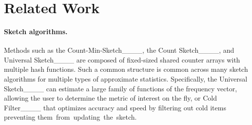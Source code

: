\section{Related Work}
\label{sec:related}

\paragraph{\textbf{Sketch algorithms.}} Methods such as the Count-Min-Sketch____, the Count Sketch____, and Universal Sketch____ are composed of fixed-sized shared counter arrays with multiple hash functions. Such a common structure is common across many sketch algorithms for multiple types of approximate statistics.  Specifically, the Universal Sketch____  can estimate a large family of functions of the frequency vector, allowing the user to determine the metric of interest on the fly, or Cold Filter____ that optimizes accuracy and speed by filtering out cold items preventing \mbox{them from updating the sketch. }

